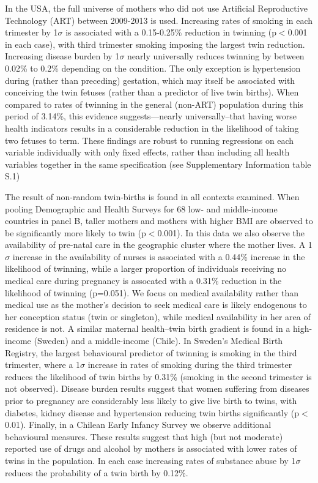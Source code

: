 \documentclass{nature}
\begin{document}
\begin{linenumbers}
In the USA, the full universe of mothers who did not use Artificial Reproductive Technology (ART) between 2009-2013 is used.  Increasing rates of smoking in each trimester by 1$\sigma$ is associated with a 0.15-0.25\% reduction in twinning (p$<$0.001 in each case), with third trimester smoking imposing the largest twin reduction.  Increasing disease burden by 1$\sigma$ nearly universally reduces twinning by between 0.02\% to 0.2\% depending on the condition.  The only exception is hypertension during (rather than preceding) gestation, which may itself be associated with conceiving the twin fetuses (rather than a predictor of live twin births). When compared to rates of twinning in the general (non-ART) population during this period of 3.14\%, this evidence suggests---nearly universally--that having worse health indicators results in a considerable reduction in the likelihood of taking two fetuses to term.  These findings are robust to running regressions on each variable individually with only fixed effects, rather than including all health variables together in the same specification (see Supplementary Information table S.1)



The result of non-random twin-births is found in all contexts examined. When pooling Demographic and Health Surveys for 68 low- and middle-income countries in panel B, taller mothers and mothers with higher BMI are observed to be significantly more likely to twin (p$<$0.001).  In this data we also observe the availability of pre-natal care in the geographic cluster where the mother lives.  A 1$\sigma$ increase in the availability of nurses is associated with a 0.44\% increase in the likelihood of twinning, while a larger proportion of individuals receiving no medical care during pregnancy is assocated with a 0.31\% reduction in the likelihood of twinning (p=0.051).  We focus on medical availability rather than medical use as the mother's decision to seek medical care is likely endogenous to her conception status (twin or singleton), while medical availability in her area of residence is not.  A similar maternal health--twin birth gradient is found in a high-income (Sweden) and a middle-income (Chile).  In Sweden's Medical Birth Registry, the largest behavioural predictor of twinning is smoking in the third trimester, where a 1$\sigma$ increase in rates of smoking during the third trimester reduces the likelihood of twin births by 0.31\% (smoking in the second trimester is not observed).  Disease burden results suggest that women suffering from diseases prior to pregnancy are considerably less likely to give live birth to twins, with diabetes, kidney disease and hypertension reducing twin births significantly (p$<$0.01).  Finally, in a Chilean Early Infancy Survey we observe additional behavioural measures.  These results suggest that high (but not moderate) reported use of drugs and alcohol by mothers is associated with lower rates of twins in the population.  In each case increasing rates of substance abuse by 1$\sigma$ reduces the probability of a twin birth by 0.12\%.


\end{linenumbers}
\end{document}

